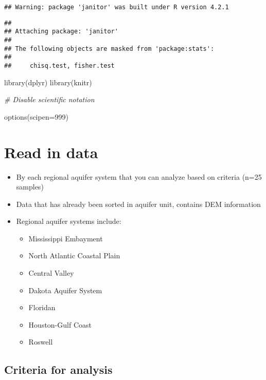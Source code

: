 \documentclass[
]{article}
\newenvironment{Shaded}{\begin{snugshade}}{\end{snugshade}}
\newcommand{\AttributeTok}[1]{\textcolor[rgb]{0.77,0.63,0.00}{#1}}
\newcommand{\CommentTok}[1]{\textcolor[rgb]{0.56,0.35,0.01}{\textit{#1}}}
\newcommand{\DecValTok}[1]{\textcolor[rgb]{0.00,0.00,0.81}{#1}}
\newcommand{\FunctionTok}[1]{\textcolor[rgb]{0.00,0.00,0.00}{#1}}
\newcommand{\NormalTok}[1]{#1}
\providecommand{\tightlist}{%
  \setlength{\itemsep}{0pt}\setlength{\parskip}{0pt}}
\begin{document}
\begin{verbatim}
## Warning: package 'janitor' was built under R version 4.2.1
\end{verbatim}

\begin{verbatim}
## 
## Attaching package: 'janitor'
## 
## The following objects are masked from 'package:stats':
## 
##     chisq.test, fisher.test
\end{verbatim}

\begin{Shaded}
\begin{Highlighting}[]
\FunctionTok{library}\NormalTok{(dplyr)}
\FunctionTok{library}\NormalTok{(knitr)}


\CommentTok{\# Disable scientific notation }

\FunctionTok{options}\NormalTok{(}\AttributeTok{scipen=}\DecValTok{999}\NormalTok{)}
\end{Highlighting}
\end{Shaded}

\hypertarget{read-in-data}{%
\section{Read in data}\label{read-in-data}}

\begin{itemize}
\tightlist
\item
  By each regional aquifer system that you can analyze based on criteria
  (n=25 samples)
\item
  Data that has already been sorted in aquifer unit, contains DEM
  information
\item
  Regional aquifer systems include:

  \begin{itemize}
  \tightlist
  \item
    Mississippi Embayment
  \item
    North Atlantic Coastal Plain
  \item
    Central Valley
  \item
    Dakota Aquifer System
  \item
    Floridan
  \item
    Houston-Gulf Coast
  \item
    Roswell
  \end{itemize}
\end{itemize}

\hypertarget{criteria-for-analysis}{%
\subsection{Criteria for analysis}\label{criteria-for-analysis}}
\end{document}
